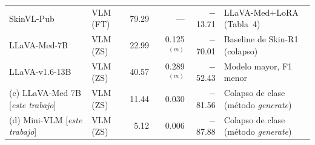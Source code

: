 \begin{table}[htbp]
{\begin{tabular}{@{}llrrrl@{}}
\addlinespace[4pt]
\cite{MMSkin2025} SkinVL-Pub
  & VLM (FT) & 79.29 & --- & $-$13.71 & LLaVA-Med$+$LoRA (Tabla~4) \\

\cite{SkinR12025} LLaVA-Med-7B
  & VLM (ZS) & 22.99 & 0.125$^{(m)}$ & $-$70.01 & Baseline de Skin-R1 (colapso) \\

\cite{SkinR12025} LLaVA-v1.6-13B
  & VLM (ZS) & 40.57 & 0.289$^{(m)}$ & $-$52.43 & Modelo mayor, F1 menor \\

\addlinespace[4pt]
\rowcolor{thiswork}
(c) LLaVA-Med 7B [\textit{este trabajo}]
  & VLM (ZS) & 11.44 & 0.030 & $-$81.56 & Colapso de clase (método \textit{generate}) \\

\rowcolor{thiswork}
(d) Mini-VLM [\textit{este trabajo}]
  & VLM (ZS) & 5.12 & 0.006 & $-$87.88 & Colapso de clase (método \textit{generate}) \\


\end{tabular}}
\end{table}
